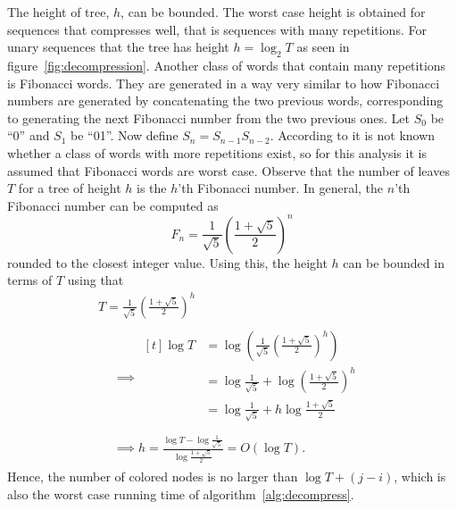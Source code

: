 \begin{enumerate}
  The height of tree, $h$, can be bounded. The worst case height is obtained
  for sequences that compresses well, that is sequences with many repetitions.
  For unary sequences that the tree has height $h = \log_2 T$ as seen in
  figure~\ref{fig:decompression}. Another class of words that contain many
  repetitions is Fibonacci words. They are generated in a way very similar to
  how Fibonacci numbers are generated by concatenating the two previous words,
  corresponding to generating the next Fibonacci number from the two previous
  ones. Let $S_0$ be ``0'' and $S_1$ be ``01''. Now define
  $S_n=S_{n-1}S_{n-2}$. According to \citet{fraenkel1998many} it is not known
  whether a class of words with more repetitions exist, so for this analysis
  it is assumed that Fibonacci words are worst case. Observe that the number of
  leaves $T$ for a tree of height $h$ is the $h$'th Fibonacci number. In
  general, the $n$'th Fibonacci number can be computed as
  \begin{equation*}
    F_n = \frac{1}{\sqrt{5}}
    {\left(
        \frac{1 + \sqrt{5}}{2}
      \right)}^n
  \end{equation*}
  rounded to the closest integer value. Using this, the height $h$ can be
  bounded in terms of $T$ using that
  \begin{gather*}
      T = \frac{1}{\sqrt{5}} {\left( \frac{1 + \sqrt{5}}{2} \right)}^h \\
      \begin{aligned}
        &\implies
        \begin{aligned}[t]
          \log T & = \log \left( \frac{1}{\sqrt{5}} {\left( \frac{1 + \sqrt{5}}{2} \right)}^h \right) \\
                 & = \log \frac{1}{\sqrt{5}} + \log {\left( \frac{1 + \sqrt{5}}{2} \right)}^h         \\
                 & = \log \frac{1}{\sqrt{5}} + h \log  \frac{1 + \sqrt{5}}{2}                         \\
        \end{aligned} \\
        &\implies h = \frac{\log T - \log \frac{1}{\sqrt{5}}}{\log \frac{1 + \sqrt{5}}{2}} = O\left(\log T\right).
      \end{aligned}
  \end{gather*}
  Hence, the number of colored nodes is no larger than $\log T + (j - i)$,
  which is also the worst case running time of algorithm~\ref{alg:decompress}.


\end{enumerate}
